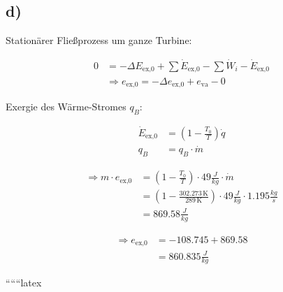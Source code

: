 

\subsection*{d)}

Stationärer Fließprozess um ganze Turbine:

\begin{align*}
0 &= -\Delta E_{\text{ex,0}} + \sum \dot{E}_{\text{ex,0}} - \sum \dot{W}_i - \dot{E}_{\text{ex,0}} \\
&\Rightarrow e_{\text{ex,0}} = -\Delta e_{\text{ex,0}} + e_{\text{va}} - 0
\end{align*}

Exergie des Wärme-Stromes $q_B$:

\begin{align*}
\dot{E}_{\text{ex,0}} &= \left( 1 - \frac{T_0}{T} \right) \dot{q} \\
q_B &= q_B \cdot \dot{m}
\end{align*}

\begin{align*}
\Rightarrow m \cdot e_{\text{ex,0}} &= \left( 1 - \frac{T_0}{T} \right) \cdot 49 \frac{J}{kg} \cdot \dot{m} \\
&= \left( 1 - \frac{302.273 \, \text{K}}{289 \, \text{K}} \right) \cdot 49 \frac{J}{kg} \cdot 1.195 \frac{kg}{s} \\
&= 869.58 \frac{J}{kg}
\end{align*}

\begin{align*}
\Rightarrow e_{\text{ex,0}} &= -108.745 + 869.58 \\
&= 860.835 \frac{J}{kg}
\end{align*}

``````latex